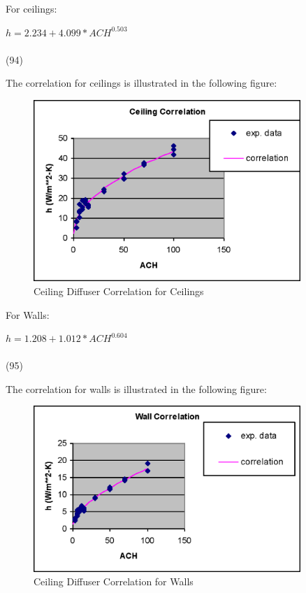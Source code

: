 For ceilings:

\(h = 2.234 + 4.099 * AC{H^{0.503}}\) ~~~~~~~~~~~~~~~~~~~~~~~~~~~~~~~~~~~~~~~~~~~~~~~~~~~~~~~~~~~~~~~~~~~~ (94)

The correlation for ceilings is illustrated in the following figure:

\begin{figure}[hbtp] %
\centering
\includegraphics[width=0.9\textwidth, height=0.9\textheight, keepaspectratio=true]{media/image380.png}
\caption{Ceiling Diffuser Correlation for Ceilings \protect \label{fig:ceiling-diffuser-correlation-for-ceilings}}
\end{figure}

For Walls:

\(h = 1.208 + 1.012 * AC{H^{0.604}}\) ~~~~~~~~~~~~~~~~~~~~~~~~~~~~~~~~~~~~~~~~~~~~~~~~~~~~~~~~~~~~~~~~~~~~~ (95)

The correlation for walls is illustrated in the following figure:

\begin{figure}[hbtp] %
\centering
\includegraphics[width=0.9\textwidth, height=0.9\textheight, keepaspectratio=true]{media/image382.png}
\caption{Ceiling Diffuser Correlation for Walls \protect \label{fig:ceiling-diffuser-correlation-for-walls}}
\end{figure}

